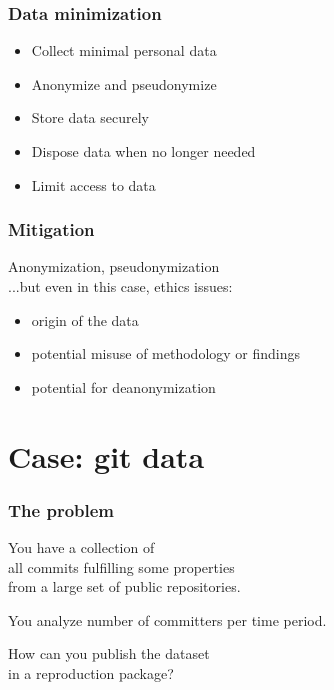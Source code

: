 \documentclass[17pt,aspectratio=169,hyperref={pdfusetitle,colorlinks,allcolors=olive}]{beamer}
\begin{document}
\begin{frame}[fragile]
  \frametitle{Data minimization}

  \begin{itemize}
  \item Collect minimal personal data
  \item Anonymize and pseudonymize
  \item Store data securely
  \item Dispose data when no longer needed
  \item Limit access to data
  \end{itemize}
\end{frame}

\begin{frame}[fragile]
  \frametitle{Mitigation}

  Anonymization, pseudonymization \\
  \vspace{.5cm}
  ...but even in this case, ethics issues: \\

  \begin{itemize}
  \item origin of the data
  \item potential misuse of methodology or findings
  \item potential for deanonymization
  \end{itemize}
\end{frame}



\section{Case: git data}

\begin{frame}[fragile]
  \frametitle{The problem}

  You have a collection of \\
  all commits fulfilling some properties \\
  from a large set of public repositories. \\

  \vspace{.3cm}
  
  You analyze number of committers per time period.

  \vspace{.3cm}

  How can you publish the dataset \\
  in a reproduction package? \\
\end{frame}
\end{document}
